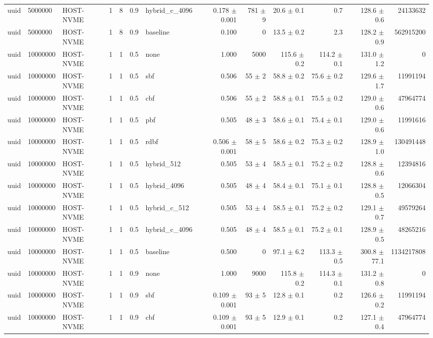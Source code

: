 \begin{tabular}{lllllllrrrrrr}
uuid & 5000000 & HOST-NVME & 1 & 8 & 0.9 & hybrid\_c\_4096 & 0.178 $\pm$ 0.001 & 781 $\pm$ 9 & 20.6 $\pm$ 0.1 & 0.7 & 128.6 $\pm$ 0.6 & 24133632 \\
uuid & 5000000 & HOST-NVME & 1 & 8 & 0.9 & baseline & 0.100 & 0 & 13.5 $\pm$ 0.2 & 2.3 & 128.2 $\pm$ 0.9 & 562915200 \\
uuid & 10000000 & HOST-NVME & 1 & 1 & 0.5 & none & 1.000 & 5000 & 115.6 $\pm$ 0.2 & 114.2 $\pm$ 0.1 & 131.0 $\pm$ 1.2 & 0 \\
uuid & 10000000 & HOST-NVME & 1 & 1 & 0.5 & sbf & 0.506 & 55 $\pm$ 2 & 58.8 $\pm$ 0.2 & 75.6 $\pm$ 0.2 & 129.6 $\pm$ 1.7 & 11991194 \\
uuid & 10000000 & HOST-NVME & 1 & 1 & 0.5 & cbf & 0.506 & 55 $\pm$ 2 & 58.8 $\pm$ 0.1 & 75.5 $\pm$ 0.2 & 129.0 $\pm$ 0.6 & 47964774 \\
uuid & 10000000 & HOST-NVME & 1 & 1 & 0.5 & pbf & 0.505 & 48 $\pm$ 3 & 58.6 $\pm$ 0.1 & 75.4 $\pm$ 0.1 & 129.0 $\pm$ 0.6 & 11991616 \\
uuid & 10000000 & HOST-NVME & 1 & 1 & 0.5 & rdbf & 0.506 $\pm$ 0.001 & 58 $\pm$ 5 & 58.6 $\pm$ 0.2 & 75.3 $\pm$ 0.2 & 128.9 $\pm$ 1.0 & 130491448 \\
uuid & 10000000 & HOST-NVME & 1 & 1 & 0.5 & hybrid\_512 & 0.505 & 53 $\pm$ 4 & 58.5 $\pm$ 0.1 & 75.2 $\pm$ 0.2 & 128.8 $\pm$ 0.6 & 12394816 \\
uuid & 10000000 & HOST-NVME & 1 & 1 & 0.5 & hybrid\_4096 & 0.505 & 48 $\pm$ 4 & 58.4 $\pm$ 0.1 & 75.1 $\pm$ 0.1 & 128.8 $\pm$ 0.5 & 12066304 \\
uuid & 10000000 & HOST-NVME & 1 & 1 & 0.5 & hybrid\_c\_512 & 0.505 & 53 $\pm$ 4 & 58.5 $\pm$ 0.1 & 75.2 $\pm$ 0.2 & 129.1 $\pm$ 0.7 & 49579264 \\
uuid & 10000000 & HOST-NVME & 1 & 1 & 0.5 & hybrid\_c\_4096 & 0.505 & 48 $\pm$ 4 & 58.5 $\pm$ 0.1 & 75.2 $\pm$ 0.1 & 128.9 $\pm$ 0.5 & 48265216 \\
uuid & 10000000 & HOST-NVME & 1 & 1 & 0.5 & baseline & 0.500 & 0 & 97.1 $\pm$ 6.2 & 113.3 $\pm$ 0.5 & 300.8 $\pm$ 77.1 & 1134217808 \\
uuid & 10000000 & HOST-NVME & 1 & 1 & 0.9 & none & 1.000 & 9000 & 115.8 $\pm$ 0.2 & 114.3 $\pm$ 0.1 & 131.2 $\pm$ 0.8 & 0 \\
uuid & 10000000 & HOST-NVME & 1 & 1 & 0.9 & sbf & 0.109 $\pm$ 0.001 & 93 $\pm$ 5 & 12.8 $\pm$ 0.1 & 0.2 & 126.6 $\pm$ 0.2 & 11991194 \\
uuid & 10000000 & HOST-NVME & 1 & 1 & 0.9 & cbf & 0.109 $\pm$ 0.001 & 93 $\pm$ 5 & 12.9 $\pm$ 0.1 & 0.2 & 127.1 $\pm$ 0.4 & 47964774 \\

\end{tabular}
